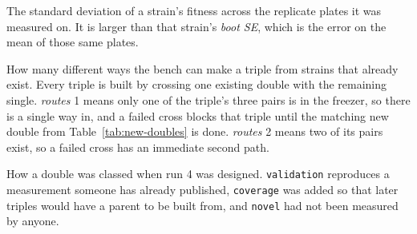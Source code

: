 \begin{description}[leftmargin=1.2em,itemsep=2pt,topsep=2pt]
\item[plate SD] The standard deviation of a strain's fitness across the
  replicate plates it was measured on. It is larger than that strain's
  \emph{boot SE}, which is the error on the mean of those same plates.

\item[routes] How many different ways the bench can make a triple from strains
  that already exist. Every triple is built by crossing one existing double with
  the remaining single. \emph{routes} 1 means only one of the triple's three
  pairs is in the freezer, so there is a single way in, and a failed cross
  blocks that triple until the matching new double from
  Table~\ref{tab:new-doubles} is done. \emph{routes} 2 means two of its pairs
  exist, so a failed cross has an immediate second path.

\item[tier] How a double was classed when run 4 was designed.
  \texttt{validation} reproduces a measurement someone has already published,
  \texttt{coverage} was added so that later triples would have a parent to be
  built from, and \texttt{novel} had not been measured by anyone.

\end{description}
